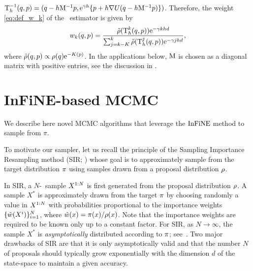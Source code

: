 \documentclass{article}
\begin{document}
$  \operatorname{T}_h^{
-1}(q,p) = (q-h\mathrm{M}^{-1} p,\mathrm{e}^{\gamma h}\{p+h \nabla U(q-h\mathrm{M}^{-1} p)\})$.
Therefore, the weight \eqref{eq:def_w_k} of the  \IFIS\  estimator is given by
\begin{equation}
w_{k}(q,p) = \frac{ \tilde \rho(\operatorname{T}^k_h(q,p)) \mathrm{e}^{-\gamma k h d} }{
    \sum_{j = k-K}^k  \tilde \rho(\operatorname{T}^j_h(q,p)) \mathrm{e}^{-\gamma j h d} },
\end{equation}
where $\tilde \rho(q,p) \propto \rho(q) \mathrm{e}^{-K(p)}$.
In the applications below, $\mathrm{M}$ is chosen as a diagonal matrix with positive entries, see the  discussion  in .

\section{InFiNE-based MCMC}\label{sec:infine:MCMC}
We describe here novel MCMC algorithms that leverage the $\InFiNE$ method to sample from $\pi$.

To motivate our sampler, let us recall the principle of the Sampling Importance Resampling method (SIR; \citet{rubin1987comment,smith1992bayesian}) whose goal is to approximately sample from the target distribution $\pi$ using samples drawn from a proposal distribution $\rho$.

In SIR, a $N$-\iid\ sample $X^{1:N}$ is first generated from the proposal distribution $\rho$. A sample $X^*$ is approximately drawn from the target $\pi$ by choosing randomly a value in $X^{1:N}$ with probabilities proportional to the importance weights $\{\tilde{w}(X^i)\}_{i = 1}^N$, where $\tilde{w}(x)= \pi(x)/\rho(x)$. Note that the importance weights are required to be known only up to a constant factor.  For SIR, as $N \to \infty$, the sample $X^*$ is \emph{asymptotically} distributed according to $\pi$; see~\cite{smith1992bayesian}. Two major drawbacks of SIR are that it is only asymptotically valid and that the number $N$ of proposals should typically grow exponentially with the dimension $d$ of the state-space to maintain a given accuracy.
\end{document}
